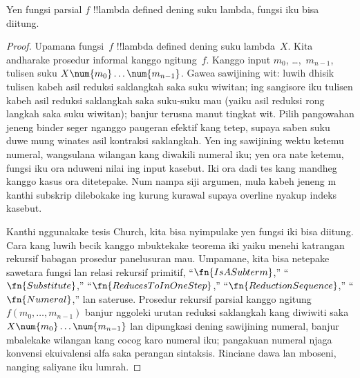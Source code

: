 \documentclass[../../../include/open-logic-section]{subfiles}
\begin{document}

\begin{thm}
Yen fungsi parsial $f$ !!{lambda defined}
dening suku lambda, fungsi iku bisa diitung.
\end{thm}

\begin{proof}
Upamana fungsi~$f$ !!{lambda defined} dening
suku lambda~$X$. Kita andharake prosedur
informal kanggo ngitung~$f$. Kanggo input
$m_0$, \dots,~$m_{n-1}$, tulisen suku
$X \num{m_0} \ldots \num{m_{n-1}}$.
Gawea sawijining wit: luwih dhisik tulisen
kabeh asil reduksi saklangkah saka suku wiwitan;
ing sangisore iku tulisen kabeh asil reduksi
saklangkah saka suku-suku mau (yaiku asil
reduksi rong langkah saka suku wiwitan);
banjur terusna manut tingkat wit. Pilih pangowahan jeneng binder seger nganggo paugeran efektif kang tetep, supaya saben suku duwe mung winates asil kontraksi saklangkah. Yen ing sawijining wektu
ketemu numeral, wangsulana wilangan kang
diwakili numeral iku; yen ora nate ketemu,
fungsi iku ora nduweni nilai ing input kasebut. Iki ora dadi tes kang mandheg kanggo kasus ora ditetepake. Num nampa siji argumen, mula kabeh jeneng m kanthi subskrip dilebokake ing kurung kurawal supaya overline nyakup indeks kasebut.

Kanthi nggunakake tesis Church, kita bisa
nyimpulake yen fungsi iki bisa diitung.
Cara kang luwih becik kanggo mbuktekake
teorema iki yaiku menehi katrangan rekursif
babagan prosedur panelusuran mau. Umpamane,
kita bisa netepake sawetara fungsi lan relasi
rekursif primitif, ``$\fn{IsASubterm}$,''
``$\fn{Substitute}$,''
``$\fn{ReducesToInOneStep}$,''
``$\fn{ReductionSequence}$,''
``$\fn{Numeral}$,'' lan sateruse.
Prosedur rekursif parsial kanggo ngitung
$f(m_0, \dots, m_{n-1})$ banjur nggoleki
urutan reduksi saklangkah kang diwiwiti saka
$X \num{m_0} \dots \num{m_{n-1}}$ lan
dipungkasi dening sawijining numeral,
banjur mbalekake wilangan kang cocog karo
numeral iku; pangakuan numeral njaga konvensi ekuivalensi alfa saka perangan sintaksis. Rinciane dawa lan mboseni,
nanging saliyane iku lumrah.
\end{proof}
\end{document}
